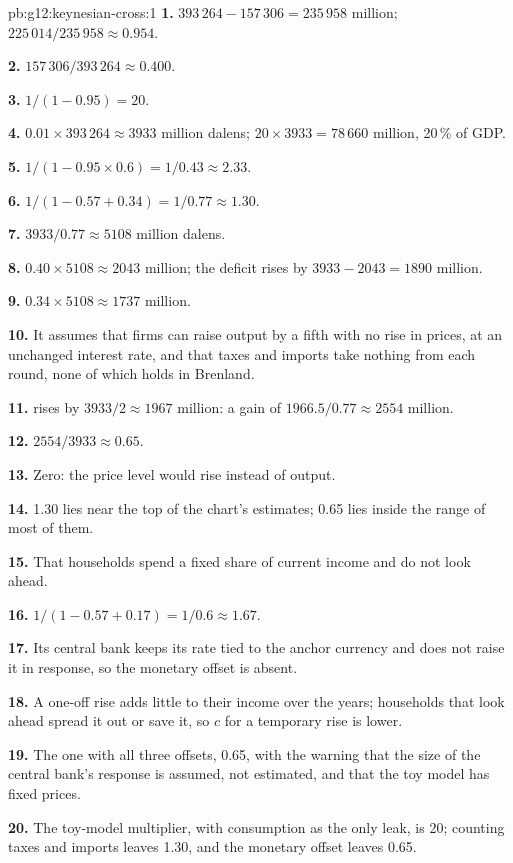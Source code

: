 \begin{solution}{pb:g12:keynesian-cross:1}
\textbf{1.} $393\,264 - 157\,306 = 235\,958$ million; $225\,014/235\,958 \approx 0.954$.

\textbf{2.} $157\,306/393\,264 \approx 0.400$.

\textbf{3.} $1/(1 - 0.95) = 20$.

\textbf{4.} $0.01 \times 393\,264 \approx 3933$ million dalens; $20 \times 3933 = 78\,660$ million, 20\,\% of GDP.

\textbf{5.} $1/(1 - 0.95 \times 0.6) = 1/0.43 \approx 2.33$.

\textbf{6.} $1/(1 - 0.57 + 0.34) = 1/0.77 \approx 1.30$.

\textbf{7.} $3933/0.77 \approx 5108$ million dalens.

\textbf{8.} $0.40 \times 5108 \approx 2043$ million; the deficit rises by $3933 - 2043 = 1890$ million.

\textbf{9.} $0.34 \times 5108 \approx 1737$ million.

\textbf{10.} It assumes that firms can raise output by a fifth with no rise in prices, at an unchanged interest rate, and that taxes and imports take nothing from each
round, none of which holds in Brenland.

\textbf{11.}  rises by $3933/2 \approx 1967$ million: a gain of $1966.5/0.77 \approx 2554$ million.

\textbf{12.} $2554/3933 \approx 0.65$.

\textbf{13.} Zero: the price level would rise instead of output.

\textbf{14.} 1.30 lies near the top of the chart's estimates; 0.65 lies inside the range of most of them.

\textbf{15.} That households spend a fixed share of current income and do not look ahead.

\textbf{16.} $1/(1 - 0.57 + 0.17) = 1/0.6 \approx 1.67$.

\textbf{17.} Its central bank keeps its rate tied to the anchor currency and does not raise it in response, so the monetary offset is absent.

\textbf{18.} A one-off rise adds little to their income over the years; households that look ahead spread it out or save it, so $c$ for a temporary rise is lower.

\textbf{19.} The one with all three offsets, 0.65, with the warning that the size of the central bank's response is assumed, not estimated, and that the toy model has
fixed prices.

\textbf{20.} The toy-model multiplier, with consumption as the only leak, is 20; counting taxes and imports leaves 1.30, and the monetary offset leaves 0.65.
\end{solution}
